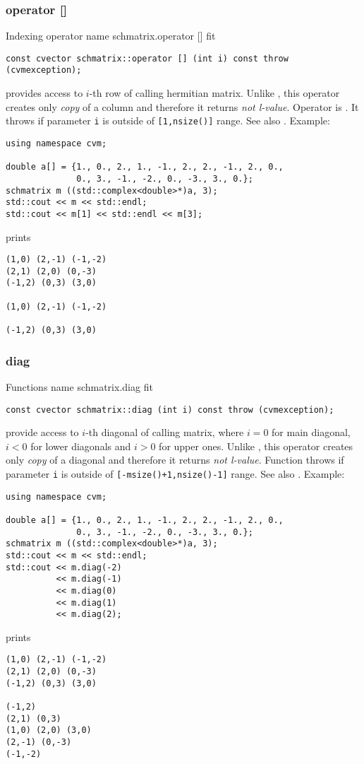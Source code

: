 \subsubsection{operator []}
Indexing operator%
\pdfdest name {schmatrix.operator []} fit
\begin{verbatim}
const cvector schmatrix::operator [] (int i) const throw (cvmexception);
\end{verbatim}
provides access to \hbox{$i$-th} row of calling hermitian matrix.
Unlike ,
this operator creates only \emph{copy} of a column and therefore
it returns
\emph{not  l-value}.
Operator is \Based.
It throws 
if parameter \verb"i" is outside of \verb"[1,nsize()]" range.
See also .
Example:
\begin{Verbatim}
using namespace cvm;

double a[] = {1., 0., 2., 1., -1., 2., 2., -1., 2., 0.,
              0., 3., -1., -2., 0., -3., 3., 0.};
schmatrix m ((std::complex<double>*)a, 3);
std::cout << m << std::endl;
std::cout << m[1] << std::endl << m[3];
\end{Verbatim}
prints
\begin{Verbatim}
(1,0) (2,-1) (-1,-2)
(2,1) (2,0) (0,-3)
(-1,2) (0,3) (3,0)

(1,0) (2,-1) (-1,-2)

(-1,2) (0,3) (3,0)
\end{Verbatim}
\newpage



\subsubsection{diag}
Functions%
\pdfdest name {schmatrix.diag} fit
\begin{verbatim}
const cvector schmatrix::diag (int i) const throw (cvmexception);
\end{verbatim}
provide access to \hbox{$i$-th} diagonal of calling matrix,
where $i=0$ for main diagonal, $i<0$ for lower diagonals 
and $i>0$ for upper ones.
Unlike ,
this operator creates only  \emph{copy} of a diagonal and therefore 
it returns \emph{not  l-value}.
Function throws 
if  parameter \verb"i" is outside of 
\verb"[-msize()+1,nsize()-1]" range.
See also .
Example:
\begin{Verbatim}
using namespace cvm;

double a[] = {1., 0., 2., 1., -1., 2., 2., -1., 2., 0.,
              0., 3., -1., -2., 0., -3., 3., 0.};
schmatrix m ((std::complex<double>*)a, 3);
std::cout << m << std::endl;
std::cout << m.diag(-2)
          << m.diag(-1)
          << m.diag(0)
          << m.diag(1)
          << m.diag(2);
\end{Verbatim}
prints
\begin{Verbatim}
(1,0) (2,-1) (-1,-2)
(2,1) (2,0) (0,-3)
(-1,2) (0,3) (3,0)

(-1,2)
(2,1) (0,3)
(1,0) (2,0) (3,0)
(2,-1) (0,-3)
(-1,-2)
\end{Verbatim}
\newpage



